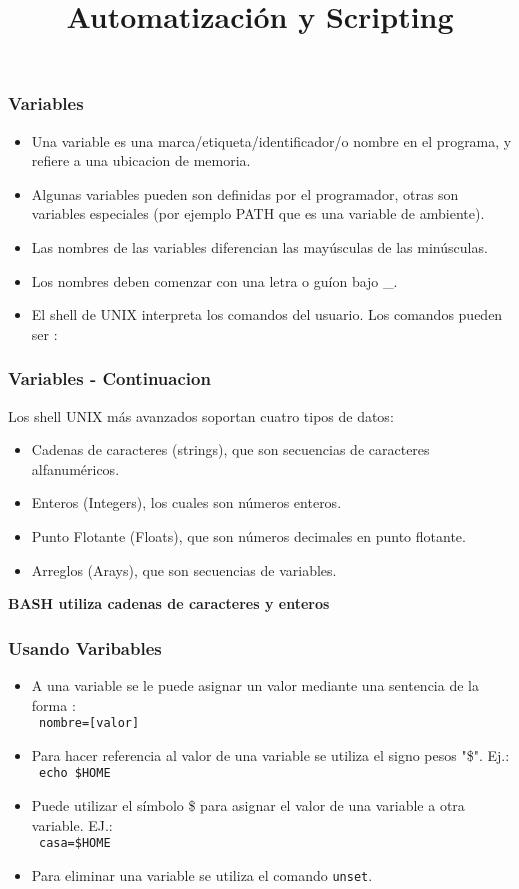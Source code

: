 \documentclass{beamer}
\title{Automatización y Scripting}
\begin{document}
\begin{frame}
  \titlepage

\end{frame}





\begin{frame}{}
\frametitle{Variables}
\begin{itemize}
\item Una variable es una marca/etiqueta/identificador/o nombre en el programa, y refiere a una ubicacion de memoria.

\item Algunas variables pueden son definidas por el programador, otras son variables especiales (por ejemplo PATH que es una variable de ambiente).
\item Las nombres de las variables diferencian las mayúsculas de las minúsculas.
\item Los nombres deben comenzar con una letra o guíon bajo \_.
\item El shell de UNIX interpreta los comandos del usuario. Los comandos pueden ser :
\end{itemize}

\end{frame}


\begin{frame}{}
\frametitle{Variables - Continuacion}
Los shell UNIX más avanzados soportan cuatro tipos de datos:
\begin{itemize}
\item Cadenas de caracteres (strings), que son secuencias de caracteres alfanuméricos. 
\item Enteros (Integers), los cuales son números enteros.
\item Punto Flotante (Floats), que son números decimales en punto flotante. 
\item Arreglos (Arays), que son secuencias de variables.
\end{itemize}
\textbf{BASH utiliza cadenas de caracteres y enteros}
\end{frame}{}

\begin{frame}{}
\frametitle{Usando Varibables}
\begin{itemize}
\item       A  una  variable se le puede asignar un valor mediante una sentencia de
       la forma :\\ 
             \texttt{        nombre=[valor]}
\item Para hacer referencia al valor de una variable se utiliza el signo pesos "\$". Ej.:\\
             \texttt{        echo \$HOME}
\item Puede utilizar el símbolo \$ para asignar el valor de una variable a otra variable. EJ.:\\
             \texttt{        casa=\$HOME}
\item Para eliminar una variable se utiliza el comando \texttt{unset}. 

\end{itemize}
\end{frame}{}
\end{document}
